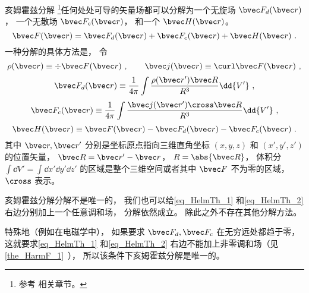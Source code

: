 
\begin{issues}
\issueTODO
\end{issues}


\begin{theorem}{亥姆霍兹分解}
\footnote{参考 \cite{GriffE} 相关章节。}任何处处可导的矢量场都可以分解为一个无旋场 $\bvec F_{d}(\bvec r)$， 一个无散场 $\bvec F_{c}(\bvec r)$， 和一个 $\bvec H(\bvec r)$。
\begin{equation}\label{eq_HelmTh_3}
\bvec F(\bvec r) = \bvec F_{d}(\bvec r) + \bvec F_{c}(\bvec r) + \bvec H(\bvec r)~.
\end{equation}
一种分解的具体方法是， 令
\begin{equation}
\rho(\bvec r) \equiv \div \bvec F(\bvec r) ~,\qquad
\bvec j(\bvec r) \equiv \curl \bvec F(\bvec r)~,
\end{equation}
\begin{equation}\label{eq_HelmTh_1}
\bvec F_{d}(\bvec r) \equiv \frac{1}{4\pi}\int \frac{\rho(\bvec r') \bvec R}{R^3} \dd{V'}~,
\end{equation}
\begin{equation}\label{eq_HelmTh_2}
\bvec F_{c}(\bvec r) \equiv \frac{1}{4\pi}\int \frac{\bvec j(\bvec r')\cross \bvec R}{R^3} \dd{V'}~,
\end{equation}
\begin{equation}\label{eq_HelmTh_4}
\bvec H(\bvec r) \equiv \bvec F(\bvec r) - \bvec F_{d}(\bvec r) - \bvec F_{c}(\bvec r)~.
\end{equation}
其中 $\bvec r, \bvec r'$ 分别是坐标原点指向三维直角坐标 $(x, y, z)$ 和 $(x', y', z')$ 的位置矢量， $\bvec R = \bvec r' - \bvec r$， $R = \abs{\bvec R}$， 体积分 $\int\dd{V'} = \int\dd{x'}\dd{y'}\dd{z'}$ 的区域是整个三维空间或者其中 $\bvec F$ 不为零的区域， $\cross$ 表示。

亥姆霍兹分解分解不是唯一的， 我们也可以给\autoref{eq_HelmTh_1} 和\autoref{eq_HelmTh_2} 右边分别加上一个任意调和场， 分解依然成立。 除此之外不存在其他分解方法。
\end{theorem}

特殊地（例如在电磁学中）， 如果要求 $\bvec F_d, \bvec F_c$ 在无穷远处都趋于零， 这就要求\autoref{eq_HelmTh_1} 和\autoref{eq_HelmTh_2} 右边不能加上非零调和场（见\autoref{the_HarmF_1}~）， 所以该条件下亥姆霍兹分解是唯一的。

